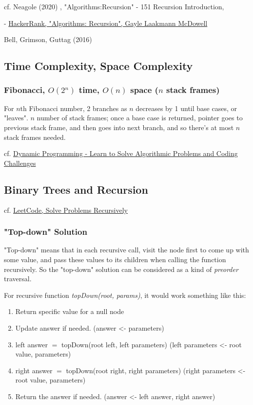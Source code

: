 \documentclass[10pt]{amsart}
\begin{document}
\begin{multicols*}{2}
cf. Neagole (2020) \cite{Neag2020}, "Algorithms:Recursion" - 151 Recursion Introduction, 


- \href{https://youtu.be/KEEKn7Me-ms}{HackerRank, "Algorithms: Recursion",  Gayle Laakmann McDowell}

Bell, Grimson, Guttag (2016) \cite{BGG2016}

\subsection{Time Complexity, Space Complexity}

\subsubsection{Fibonacci, $O(2^n)$ time, $O(n)$ space ($n$ stack frames)}

For $n$th Fibonacci number, 2 branches as $n$ decreases by 1 until base cases, or "leaves". $n$ number of stack frames; once a base case is returned, pointer goes to previous stack frame, and then goes into next branch, and so there's at most $n$ stack frames needed.

cf. \href{https://youtu.be/oBt53YbR9Kk?t=1190}{Dynamic Programming - Learn to Solve Algorithmic Problems and Coding Challenges}

\subsection{Binary Trees and Recursion}

cf. \href{https://leetcode.com/explore/learn/card/data-structure-tree/17/solve-problems-recursively/534/}{LeetCode, Solve Problems Recursively}

\subsubsection{"Top-down" Solution}

"Top-down" means that in each recursive call, visit the node first to come up with some value, and pass these values to its children when calling the function recursively. So the "top-down" solution can be considered as a kind of \emph{preorder} traversal.

For recursive function \emph{topDown(root, params)}, it would work something like this:

\begin{enumerate}
	\item Return specific value for a null node
	\item Update answer if needed. (answer <- parameters)
	\item left answer $=$ topDown(root left, left parameters) (left parameters <- root value, parameters)
	\item right answer $=$ topDown(root right, right parameters) (right parameters <- root value, parameters)
	\item Return the answer if needed. (answer <- left answer, right answer)
\end{enumerate}


\end{multicols*}
\end{document}
